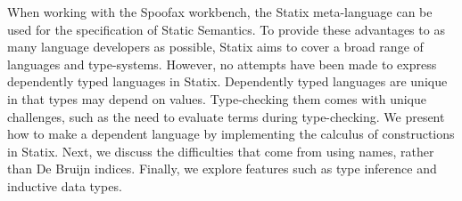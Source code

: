 
When working with the Spoofax workbench, the Statix meta-language can be used for the specification of Static Semantics. To provide these advantages to as many language developers as possible, Statix aims to cover a broad range of languages and type-systems. However, no attempts have been made to express dependently typed languages in Statix. Dependently typed languages are unique in that types may depend on values. Type-checking them comes with unique challenges, such as the need to evaluate terms during type-checking. We present how to make a dependent language by implementing the calculus of constructions in Statix. Next, we discuss the difficulties that come from using names, rather than De Bruijn indices. Finally, we explore features such as type inference and inductive data types.
